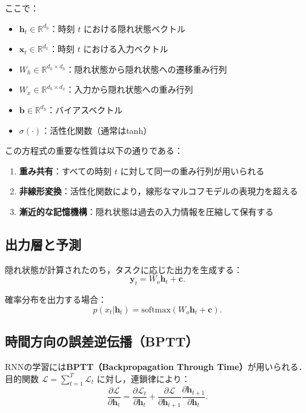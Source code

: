 ここで：
\begin{itemize}
  \item $\boldsymbol{h}_t \in \mathbb{R}^{d_h}$：時刻 $t$ における隠れ状態ベクトル
  \item $\boldsymbol{x}_t \in \mathbb{R}^{d_x}$：時刻 $t$ における入力ベクトル
  \item $W_h \in \mathbb{R}^{d_h \times d_h}$：隠れ状態から隠れ状態への遷移重み行列
  \item $W_x \in \mathbb{R}^{d_h \times d_x}$：入力から隠れ状態への重み行列
  \item $\boldsymbol{b} \in \mathbb{R}^{d_h}$：バイアスベクトル
  \item $\sigma(\cdot)$：活性化関数（通常はtanh）
\end{itemize}

この方程式の重要な性質は以下の通りである：
\begin{enumerate}
  \item \textbf{重み共有}：すべての時刻 $t$ に対して同一の重み行列が用いられる
  \item \textbf{非線形変換}：活性化関数により，線形なマルコフモデルの表現力を超える
  \item \textbf{漸近的な記憶機構}：隠れ状態は過去の入力情報を圧縮して保有する
\end{enumerate}

\subsection{出力層と予測}

隠れ状態が計算されたのち，タスクに応じた出力を生成する：
\begin{equation}
  \boldsymbol{y}_t = W_o \boldsymbol{h}_t + \boldsymbol{c}.
\end{equation}

確率分布を出力する場合：
\begin{equation}
  p(x_t | \boldsymbol{h}_t) = \mathrm{softmax}(W_o \boldsymbol{h}_t + \boldsymbol{c}).
\end{equation}

\subsection{時間方向の誤差逆伝播（BPTT）}

RNNの学習には\textbf{BPTT（Backpropagation Through Time）}が用いられる．
目的関数 $\mathcal{L} = \sum_{t=1}^T \mathcal{L}_t$ に対し，連鎖律により：
\begin{equation}
  \frac{\partial \mathcal{L}}{\partial \boldsymbol{h}_t} = \frac{\partial \mathcal{L}_t}{\partial \boldsymbol{h}_t} + \frac{\partial \mathcal{L}}{\partial \boldsymbol{h}_{t+1}} \frac{\partial \boldsymbol{h}_{t+1}}{\partial \boldsymbol{h}_t}.
\end{equation}

